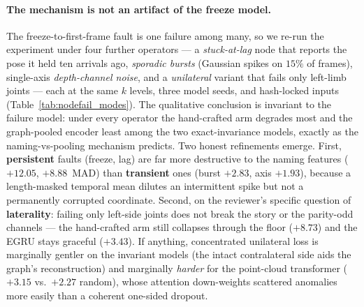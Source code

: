 \documentclass[10pt,journal]{IEEEtran}
\begin{document}
\paragraph{The mechanism is not an artifact of the freeze model.} The freeze-to-first-frame fault
is one failure among many, so we re-run the experiment under four further operators --- a
\emph{stuck-at-lag} node that reports the pose it held ten arrivals ago, \emph{sporadic bursts}
(Gaussian spikes on $15\%$ of frames), single-axis \emph{depth-channel noise}, and a
\emph{unilateral} variant that fails only left-limb joints --- each at the same $k$ levels, three
model seeds, and hash-locked inputs (Table~\ref{tab:nodefail_modes}). The qualitative conclusion is
invariant to the failure model: under every operator the hand-crafted arm degrades most and the
graph-pooled encoder least among the two exact-invariance models, exactly as the naming-vs-pooling
mechanism predicts. Two honest refinements emerge. First, \textbf{persistent} faults (freeze,
lag) are far more destructive to the naming features ($+12.05$, $+8.88$~MAD) than \textbf{transient}
ones (burst $+2.83$, axis $+1.93$), because a length-masked temporal mean dilutes an intermittent
spike but not a permanently corrupted coordinate. Second, on the reviewer's specific question of
\textbf{laterality}: failing only left-side joints does not break the story or the parity-odd
channels --- the hand-crafted arm still collapses through the floor ($+8.73$) and the EGRU stays
graceful ($+3.43$). If anything, concentrated unilateral loss is marginally gentler on the invariant
models (the intact contralateral side aids the graph's reconstruction) and marginally \emph{harder}
for the point-cloud transformer ($+3.15$ vs.\ $+2.27$ random), whose attention down-weights scattered
anomalies more easily than a coherent one-sided dropout.
\end{document}
